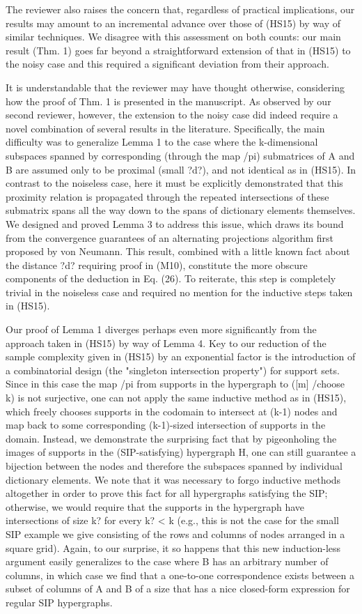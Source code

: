 The reviewer also raises the concern that, regardless of practical implications, our results may amount to an incremental advance over those of (HS15) by way of similar techniques. We disagree with this assessment on both counts: our main result (Thm. 1) goes far beyond a straightforward extension of that in (HS15) to the noisy case and this required a significant deviation from their approach.

It is understandable that the reviewer may have thought otherwise, considering how the proof of Thm. 1 is presented in the manuscript. As observed by our second reviewer, however, the extension to the noisy case did indeed require a novel combination of several results in the literature. Specifically, the main difficulty was to generalize Lemma 1 to the case where the k-dimensional subspaces spanned by corresponding (through the map /pi) submatrices of A and B are assumed only to be proximal (small ?d?), and not identical as in (HS15). In contrast to the noiseless case, here it must be explicitly demonstrated that this proximity relation is propagated through the repeated intersections of these submatrix spans all the way down to the spans of dictionary elements themselves. We designed and proved Lemma 3 to address this issue, which draws its bound from the convergence guarantees of an alternating projections algorithm first proposed by von Neumann. This result, combined with a little known fact about the distance ?d? requiring proof in (M10), constitute the more obscure components of the deduction in Eq. (26). To reiterate, this step is completely trivial in the noiseless case and required no mention for the inductive steps taken in (HS15).  

Our proof of Lemma 1 diverges perhaps even more significantly from the approach taken in (HS15) by way of Lemma 4. Key to our reduction of the sample complexity given in (HS15) by an exponential factor is the introduction of a combinatorial design (the "singleton intersection property") for support sets. Since in this case the map /pi from supports in the hypergraph to ([m] /choose k) is not surjective, one can not apply the same inductive method as in (HS15), which freely chooses supports in the codomain to intersect at (k-1) nodes and map back to some corresponding (k-1)-sized intersection of supports in the domain. Instead, we demonstrate the surprising fact that by pigeonholing the images of supports in the (SIP-satisfying) hypergraph H, one can still guarantee a bijection between the nodes and therefore the subspaces spanned by individual dictionary elements. We note that it was necessary to forgo inductive methods altogether in order to prove this fact for all hypergraphs satisfying the SIP; otherwise, we would require that the supports in the hypergraph have intersections of size k? for every k? < k (e.g., this is not the case for the small SIP example we give consisting of the rows and columns of nodes arranged in a square grid). Again, to our surprise, it so happens that this new induction-less argument easily generalizes to the case where B has an arbitrary number of columns, in which case we find that a one-to-one correspondence exists between a subset of columns of A and B of a size that has a nice closed-form expression for regular SIP hypergraphs.

